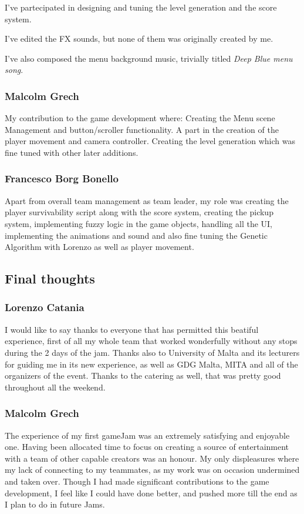 \documentclass[11pt]{article}
\begin{document}
I've partecipated in designing and tuning the level generation and the score system.

I've edited the FX sounds, but none of them was originally created by me.

I've also composed the menu background music, trivially titled \textit{Deep Blue menu song}.

\subsubsection{Malcolm Grech}
My contribution to the game development where:
Creating the Menu scene Management and button/scroller functionality.
A part in the creation of the player movement and camera controller.
Creating the level generation which was fine tuned with other later additions.

\subsubsection{Francesco Borg Bonello}

Apart from overall team management as team leader, my role was creating the player survivability script along with the score system, creating the pickup system, implementing fuzzy logic in the game objects, handling all the UI, implementing the animations and sound and also fine tuning the Genetic Algorithm with Lorenzo as well as player movement.

\subsection{Final thoughts}
\subsubsection{Lorenzo Catania}
I would like to say thanks to everyone that has permitted this beatiful experience, first of all my whole team that worked wonderfully without any stops during the 2 days of the jam. Thanks also to University of Malta and its lecturers for guiding me in its new experience, as well as GDG Malta, MITA and all of the organizers of the event. Thanks to the catering as well, that was pretty good throughout all the weekend.

\subsubsection{Malcolm Grech}
The experience of my first gameJam was an extremely satisfying and enjoyable one. Having been allocated time to focus on creating a source of entertainment with a team of other capable creators was an honour. My only displeasures where my lack of connecting to my teammates, as my work was on occasion undermined and taken over. Though I had made significant contributions to the game development, I feel like I could have done better, and pushed more till the end as I plan to do in future Jams.
\end{document}
